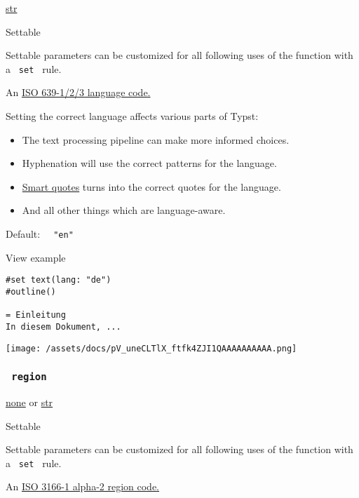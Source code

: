 \href{/docs/reference/foundations/str/}{str}

{{ Settable }}

\label{parameters-lang-settable-tooltip}
Settable parameters can be customized for all following uses of the
function with a \texttt{\ set\ } rule.

An \href{https://en.wikipedia.org/wiki/ISO_639}{ISO 639-1/2/3 language
code.}

Setting the correct language affects various parts of Typst:

\begin{itemize}
\tightlist
\item
  The text processing pipeline can make more informed choices.
\item
  Hyphenation will use the correct patterns for the language.
\item
  \href{/docs/reference/text/smartquote/}{Smart quotes} turns into the
  correct quotes for the language.
\item
  And all other things which are language-aware.
\end{itemize}

Default: \texttt{\ }{\texttt{\ "en"\ }}\texttt{\ }


View example

\begin{verbatim}
#set text(lang: "de")
#outline()

= Einleitung
In diesem Dokument, ...
\end{verbatim}

\texttt{[image: /assets/docs/pV\_uneCLTlX\_ftfk4ZJI1QAAAAAAAAAA.png]}

\subsubsection{\texorpdfstring{\texttt{\ region\ }}{ region }}\label{parameters-region}

\href{/docs/reference/foundations/none/}{none} {or}
\href{/docs/reference/foundations/str/}{str}

{{ Settable }}

\label{parameters-region-settable-tooltip}
Settable parameters can be customized for all following uses of the
function with a \texttt{\ set\ } rule.

An \href{https://en.wikipedia.org/wiki/ISO_3166-1_alpha-2}{ISO 3166-1
alpha-2 region code.}

